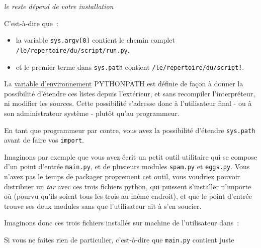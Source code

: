 \emph{le reste dépend de votre installation}

    C'est-à-dire que~:

\begin{itemize}
\tightlist
\item
  la variable \texttt{sys.argv{[}0{]}} contient le chemin complet
  \texttt{/le/repertoire/du/script/run.py},
\item
  et le premier terme dans \texttt{sys.path} contient
  \texttt{/le/repertoire/du/script!}.
\end{itemize}

    La \href{http://en.wikipedia.org/wiki/Environment_variable}{variable
d'environnement} PYTHONPATH est définie de façon à donner la possibilité
d'étendre ces listes depuis l'extérieur, et sans recompiler
l'interpréteur, ni modifier les sources. Cette possibilité s'adresse
donc à l'utilisateur final - ou à son administrateur système - plutôt
qu'au programmeur.

    En tant que programmeur par contre, vous avez la possibilité d'étendre
\texttt{sys.path} avant de faire vos \texttt{import}.

Imaginons par exemple que vous avez écrit un petit outil utilitaire qui
se compose d'un point d'entrée \texttt{main.py}, et de plusieurs modules
\texttt{spam.py} et \texttt{eggs.py}. Vous n'avez pas le temps de
packager proprement cet outil, vous voudriez pouvoir distribuer un
\emph{tar} avec ces trois fichiers python, qui puissent s'installer
n'importe où (pourvu qu'ils soient tous les trois au même endroit), et
que le point d'entrée trouve ses deux modules sans que l'utilisateur ait
à s'en soucier.

Imaginons donc ces trois fichiers installés sur machine de l'utilisateur
dans~:

    \begin{Shaded}
\begin{Highlighting}[frame=lines,framerule=0.6mm,rulecolor=\color{asisframecolor}]
\end{Highlighting}
\end{Shaded}

    Si vous ne faites rien de particulier, c'est-à-dire que \texttt{main.py}
contient juste

    \begin{Shaded}
\begin{Highlighting}[frame=lines,framerule=0.6mm,rulecolor=\color{asisframecolor}]
\end{Highlighting}
\end{Shaded}

